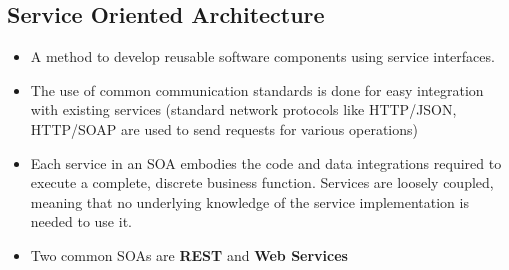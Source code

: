 \documentclass{article}
\begin{document}
\subsection{Service Oriented Architecture}
\begin{itemize}
    \item A method to develop reusable software components using service interfaces. 
    
    \item The use of common communication standards is done for easy integration with existing services (standard network protocols like HTTP/JSON, HTTP/SOAP are used to send requests for various operations)
    
    \item Each service in an SOA embodies the code and data integrations required to execute a complete, discrete business function. Services are loosely coupled, meaning that no underlying knowledge of the service implementation is needed to use it. 
    
    \item Two common SOAs are \textbf{REST} and \textbf{Web Services}
\end{itemize}
\end{document}
